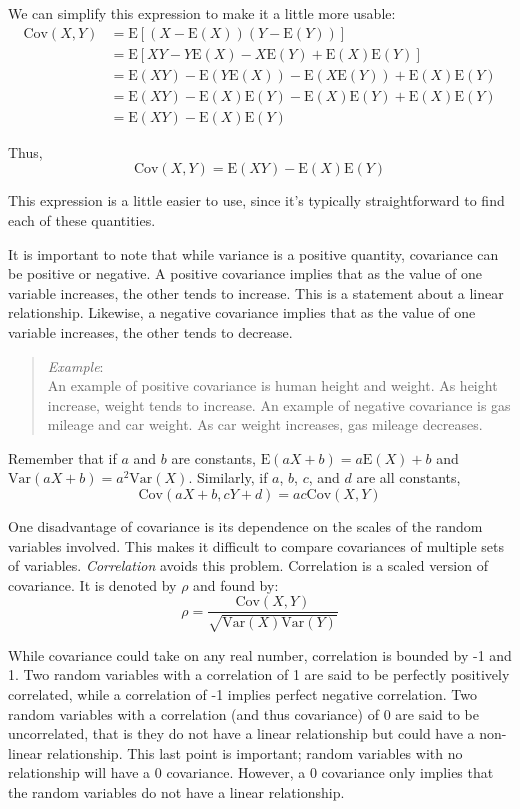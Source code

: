 \documentclass[
  letterpaper,
  DIV=11,
  numbers=noendperiod]{scrreprt}
\begin{document}
We can simplify this expression to make it a little more usable: \[
\begin{align}
\mbox{Cov}(X,Y) & = \mbox{E}\left[(X-\mbox{E}(X))(Y-\mbox{E}(Y))\right] \\
 & = \mbox{E}\left[XY - Y\mbox{E}(X) - X\mbox{E}(Y) + \mbox{E}(X)\mbox{E}(Y)\right] \\
 & = \mbox{E}(XY) - \mbox{E}(Y\mbox{E}(X)) - \mbox{E}(X\mbox{E}(Y)) + \mbox{E}(X)\mbox{E}(Y) \\
 & = \mbox{E}(XY)-\mbox{E}(X)\mbox{E}(Y)-\mbox{E}(X)\mbox{E}(Y)+\mbox{E}(X)\mbox{E}(Y) \\
 & = \mbox{E}(XY)-\mbox{E}(X)\mbox{E}(Y)
\end{align}
\]

Thus, \[
\mbox{Cov}(X,Y)=\mbox{E}(XY)-\mbox{E}(X)\mbox{E}(Y)
\]

This expression is a little easier to use, since it's typically
straightforward to find each of these quantities.

It is important to note that while variance is a positive quantity,
covariance can be positive or negative. A positive covariance implies
that as the value of one variable increases, the other tends to
increase. This is a statement about a linear relationship. Likewise, a
negative covariance implies that as the value of one variable increases,
the other tends to decrease.

\begin{quote}
\emph{Example}:\\
An example of positive covariance is human height and weight. As height
increase, weight tends to increase. An example of negative covariance is
gas mileage and car weight. As car weight increases, gas mileage
decreases.
\end{quote}

Remember that if \(a\) and \(b\) are constants,
\(\mbox{E}(aX+b) =a\mbox{E}(X)+b\) and
\(\mbox{Var}(aX+b)=a^2\mbox{Var}(X)\). Similarly, if \(a\), \(b\),
\(c\), and \(d\) are all constants, \[
\mbox{Cov}(aX+b,cY+d)=ac\mbox{Cov}(X,Y)
\]

One disadvantage of covariance is its dependence on the scales of the
random variables involved. This makes it difficult to compare
covariances of multiple sets of variables. \emph{Correlation} avoids
this problem. Correlation is a scaled version of covariance. It is
denoted by \(\rho\) and found by: \[
\rho = \frac{\mbox{Cov}(X,Y)}{\sqrt{\mbox{Var}(X)\mbox{Var}(Y)}}
\]

While covariance could take on any real number, correlation is bounded
by -1 and 1. Two random variables with a correlation of 1 are said to be
perfectly positively correlated, while a correlation of -1 implies
perfect negative correlation. Two random variables with a correlation
(and thus covariance) of 0 are said to be uncorrelated, that is they do
not have a linear relationship but could have a non-linear relationship.
This last point is important; random variables with no relationship will
have a 0 covariance. However, a 0 covariance only implies that the
random variables do not have a linear relationship.
\end{document}
